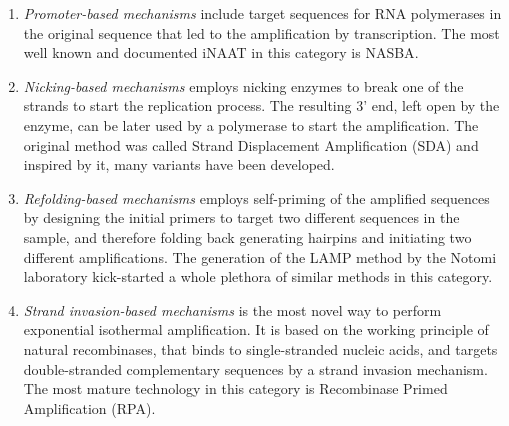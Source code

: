 \begin{enumerate}
   \item \emph{Promoter-based mechanisms} include target sequences for RNA polymerases in the original sequence that led to the amplification by transcription. The most well known and documented iNAAT in this category is NASBA\cite{compton_nucleic_1991}. 
   \item \emph{Nicking-based mechanisms} employs nicking enzymes to  break one of the strands to start the replication process. The resulting 3' end, left open by the enzyme, can be later used by a polymerase to start the amplification. The original method was called Strand Displacement Amplification (SDA)\cite{ness_isothermal_2003} and inspired by it, many variants have been developed.
   \linebreak
   \linebreak
   \item \emph{Refolding-based mechanisms} employs self-priming of the amplified sequences by designing the initial primers to target two different sequences in the sample, and therefore folding back generating hairpins and initiating two different amplifications. The generation of the LAMP method by the Notomi laboratory kick-started a whole plethora of similar methods in this category\cite{notomi_loop-mediated_2000}. 
   \item \emph{Strand invasion-based mechanisms} is the most novel way to perform exponential isothermal amplification. It is based on the working principle of natural recombinases, that binds to single-stranded nucleic acids, and targets double-stranded complementary sequences by a strand invasion mechanism. The most mature technology in this category is Recombinase Primed Amplification (RPA)\cite{piepenburg_dna_2006}.
\end{enumerate}

